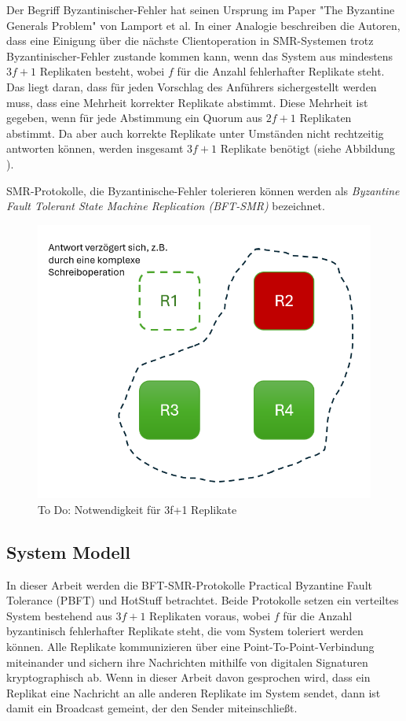 \documentclass[nonacm,sigconf,natbib=false]{acmart}
\begin{document}
Der Begriff Byzantinischer-Fehler hat seinen Ursprung im Paper "The Byzantine Generals Problem"\cite{byzantine-generals-problem} von Lamport et al. In einer Analogie beschreiben die Autoren, dass eine Einigung über die nächste Clientoperation in SMR-Systemen trotz Byzantinischer-Fehler zustande kommen kann, wenn das System aus mindestens $3f+1$ Replikaten besteht, wobei $f$ für die Anzahl fehlerhafter Replikate steht. Das liegt daran, dass für jeden Vorschlag des Anführers sichergestellt werden muss, dass eine Mehrheit korrekter Replikate abstimmt. Diese Mehrheit ist gegeben, wenn für jede Abstimmung ein Quorum aus $2f+1$ Replikaten abstimmt. Da aber auch korrekte Replikate unter Umständen nicht rechtzeitig antworten können, werden insgesamt $3f+1$ Replikate benötigt (siehe Abbildung ).

SMR-Protokolle, die Byzantinische-Fehler tolerieren können werden als \emph{Byzantine Fault Tolerant State Machine Replication (BFT-SMR)} bezeichnet.

\begin{figure}
  \centering
  \includegraphics[width=0.5\linewidth]{bft-quorum.png}
  \caption{To Do: Notwendigkeit für 3f+1 Replikate}
  \label{fig:bft-quorum}
\end{figure}

\subsection{System Modell}

In dieser Arbeit werden die BFT-SMR-Protokolle Practical Byzantine Fault Tolerance (PBFT)\cite{pbft} und HotStuff\cite{hotstuff} betrachtet. Beide Protokolle setzen ein verteiltes System bestehend aus $3f+1$ Replikaten voraus, wobei $f$ für die Anzahl byzantinisch fehlerhafter Replikate steht, die vom System toleriert werden können. Alle Replikate kommunizieren über eine Point-To-Point-Verbindung miteinander und sichern ihre Nachrichten mithilfe von digitalen Signaturen kryptographisch ab. Wenn in dieser Arbeit davon gesprochen wird, dass ein Replikat eine Nachricht an alle anderen Replikate im System sendet, dann ist damit ein Broadcast gemeint, der den Sender miteinschließt.
\end{document}
